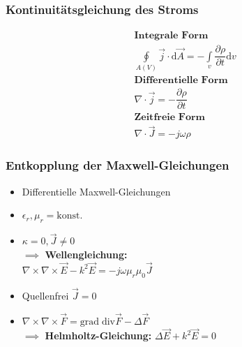 	 \subsubsection{Kontinuitätsgleichung des Stroms}
	 {\small%
	 \begin{align*}
	 	& \mathrm{\textbf{Integrale Form}}\\
		& \oint\limits_{A(V)}\vec{j}\cdot\mathrm{d}\vec{A} = -\int\limits_v \dfrac{\partial \rho}{\partial t} \mathrm{d}v\\
		& \mathrm{\textbf{Differentielle Form}}\\
		& \nabla\cdot\vec{j} = -\dfrac{\partial \rho}{\partial t}\\
		& \mathrm{\textbf{Zeitfreie Form}}\\
		& \nabla\cdot\vec{J} = -j\omega\rho
	 \end{align*}
	 \subsubsection{Entkopplung der Maxwell-Gleichungen}
	 \begin{itemize}
	 	\itemsep0pt
		\item Differentielle Maxwell-Gleichungen
		\item \(\epsilon_r, \mu_r = \mathrm{konst.}\)
		\item \(\kappa = 0, \vec{J} \neq 0\)\\
	 	\(\implies\) \textbf{Wellengleichung:}\\\vspace{2pt}
		\(\nabla\!\times\!\nabla\!\times\!\vec{E} - k^2\vec{E} = -j\omega\mu_r\mu_0\vec{J}\)
		\item Quellenfrei \(\vec{J} = 0\)
		\item \(\nabla\!\times\!\nabla\!\times\!\vec{F} = \mathrm{grad}\;\mathrm{div}\vec{F} - \Delta\vec{F}\)\\
		\(\implies\) \textbf{Helmholtz-Gleichung:} \(\Delta\vec{E} + k^2\vec{E} = 0\)
	 \end{itemize}

}
